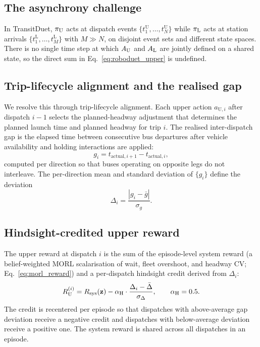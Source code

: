 \subsection{The asynchrony challenge}

In TransitDuet, $\pi_{\mathrm{U}}$ acts at dispatch events $\{t_1^{\mathrm{U}}, \ldots, t_N^{\mathrm{U}}\}$ while $\pi_{\mathrm{L}}$ acts at station arrivals $\{t_1^{\mathrm{L}}, \ldots, t_M^{\mathrm{L}}\}$ with $M \gg N$, on disjoint event sets and different state spaces. There is no single time step at which $A_{\mathrm{U}}$ and $A_{\mathrm{L}}$ are jointly defined on a shared state, so the direct sum in Eq.~\eqref{eq:roboduet_upper} is undefined.

\subsection{Trip-lifecycle alignment and the realised gap}

We resolve this through trip-lifecycle alignment. Each upper action $a_{\mathrm{U},i}$ after dispatch $i-1$ selects the planned-headway adjustment that determines the planned launch time and planned headway for trip $i$. The realised inter-dispatch gap is the elapsed time between consecutive bus departures after vehicle availability and holding interactions are applied:
\begin{equation}
  g_i = t_{\mathrm{actual},i+1} - t_{\mathrm{actual},i},
\end{equation}
computed per direction so that buses operating on opposite legs do not interleave. The per-direction mean and standard deviation of $\{g_i\}$ define the deviation
\begin{equation}
  \Delta_i = \frac{|g_i - \bar{g}|}{\sigma_g}.
  \label{eq:gap_dev}
\end{equation}

\subsection{Hindsight-credited upper reward}

The upper reward at dispatch $i$ is the sum of the episode-level system reward (a belief-weighted MORL scalarisation of wait, fleet overshoot, and headway CV; Eq.~\ref{eq:morl_reward}) and a per-dispatch hindsight credit derived from $\Delta_i$:
\begin{equation}
  R_{\mathrm{U}}^{(i)} = R_{\mathrm{sys}}(\mathbf{z}) - \alpha_{\mathrm{H}} \cdot \frac{\Delta_i - \bar{\Delta}}{\sigma_{\Delta}}, \qquad \alpha_{\mathrm{H}} = 0.5.
  \label{eq:hindsight_reward_app}
\end{equation}
The credit is recentered per episode so that dispatches with above-average gap deviation receive a negative credit and dispatches with below-average deviation receive a positive one. The system reward is shared across all dispatches in an episode.

